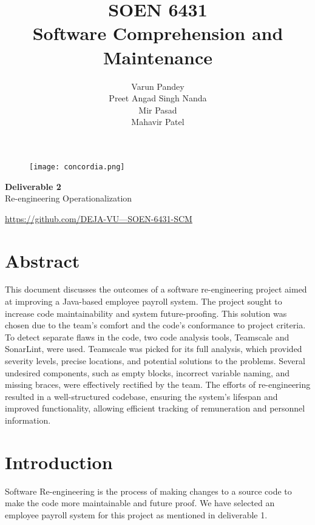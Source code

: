 \documentclass[12pt,english]{article}
\title{\textbf{SOEN 6431 \\ Software Comprehension and Maintenance}}
\author{Varun Pandey \\ Preet Angad Singh Nanda \\ Mir Pasad \\ Mahavir Patel }
\date{}
\begin{document}
\begin{figure}
    \centering
    \texttt{[image: concordia.png]}
\end{figure}
    
\maketitle
\vspace{3cm}
\begin{center}
    \huge{\textbf{Deliverable 2} \\ Re-engineering Operationalization}
\end{center}

\vspace{3cm}


\begin{center}
    \href{https://github.com/mahavir0/DEJA-VU---SOEN-6431-SCM}{\Large{https://github.com/DEJA-VU---SOEN-6431-SCM}}
\end{center}

\newpage

\tableofcontents

\newpage

\section{Abstract}
This document discusses the outcomes of a software re-engineering project aimed at improving a Java-based employee payroll system. The project sought to increase code maintainability and system future-proofing. This solution was chosen due to the team's comfort and the code's conformance to project criteria. To detect separate flaws in the code, two code analysis tools, Teamscale and SonarLint, were used. Teamscale was picked for its full analysis, which provided severity levels, precise locations, and potential solutions to the problems. Several undesired components, such as empty blocks, incorrect variable naming, and missing braces, were effectively rectified by the team. The efforts of re-engineering resulted in a well-structured codebase, ensuring the system's lifespan and improved functionality, allowing efficient tracking of remuneration and personnel information.

\section{Introduction}

Software Re-engineering is the process of making changes to a source code to make the code more maintainable and future proof. We have selected an employee payroll system for this project as mentioned in deliverable 1. 
\end{document}
